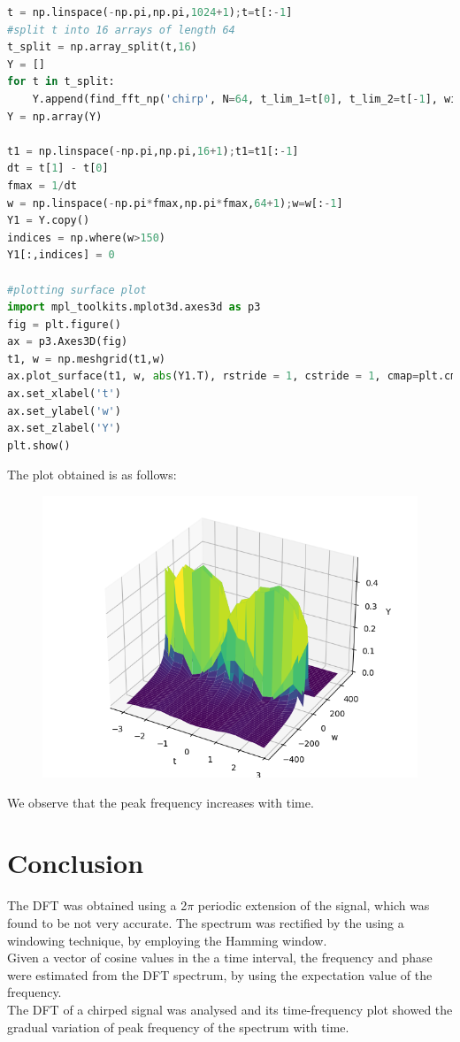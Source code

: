 \documentclass[11pt, a4paper]{article}
\begin{document}
\begin{lstlisting}[language = Python]
t = np.linspace(-np.pi,np.pi,1024+1);t=t[:-1]
#split t into 16 arrays of length 64
t_split = np.array_split(t,16)
Y = []
for t in t_split:
    Y.append(find_fft_np('chirp', N=64, t_lim_1=t[0], t_lim_2=t[-1], windowing=False, x_limit = 50, plot = False)[0])
Y = np.array(Y)

t1 = np.linspace(-np.pi,np.pi,16+1);t1=t1[:-1]
dt = t[1] - t[0]
fmax = 1/dt
w = np.linspace(-np.pi*fmax,np.pi*fmax,64+1);w=w[:-1]
Y1 = Y.copy()
indices = np.where(w>150)
Y1[:,indices] = 0

#plotting surface plot
import mpl_toolkits.mplot3d.axes3d as p3
fig = plt.figure()
ax = p3.Axes3D(fig)
t1, w = np.meshgrid(t1,w)
ax.plot_surface(t1, w, abs(Y1.T), rstride = 1, cstride = 1, cmap=plt.cm.viridis)
ax.set_xlabel('t')
ax.set_ylabel('w')
ax.set_zlabel('Y')
plt.show()

\end{lstlisting}

The plot obtained is as follows:

\begin{figure}[H]
     \centering
     \includegraphics[scale=0.6]{Figure_9.png}
\end{figure}
We observe that the peak frequency increases with time.

\section{Conclusion}
The DFT was obtained using a 2$\pi$ periodic extension of the signal, which was found to be not very accurate. The
spectrum was rectified by the using a windowing technique, by employing the
Hamming window. \\Given a vector of cosine values in the a time interval, the
frequency and phase were estimated from the DFT spectrum, by using the
expectation value of the frequency. \\The DFT of a chirped signal was analysed and its time-frequency plot showed the gradual variation of peak frequency of the spectrum with time.
\end{document}
